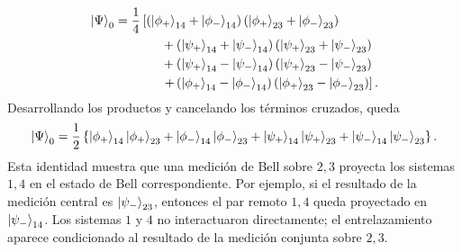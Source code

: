 \documentclass[../main.tex]{subfiles}
\begin{document}
\begin{align*}
    \ket{\Psi}_0
    &=
    \frac{1}{4}
    \left[
        \left(
            \ket{\phi_+}_{14}+\ket{\phi_-}_{14}
        \right)
        \left(
            \ket{\phi_+}_{23}+\ket{\phi_-}_{23}
        \right)
    \right.\\
    &\hspace{1.3cm}
        +
        \left(
            \ket{\psi_+}_{14}+\ket{\psi_-}_{14}
        \right)
        \left(
            \ket{\psi_+}_{23}+\ket{\psi_-}_{23}
        \right)\\
    &\hspace{1.3cm}
        +
        \left(
            \ket{\psi_+}_{14}-\ket{\psi_-}_{14}
        \right)
        \left(
            \ket{\psi_+}_{23}-\ket{\psi_-}_{23}
        \right)\\
    &\hspace{1.3cm}
    \left.
        +
        \left(
            \ket{\phi_+}_{14}-\ket{\phi_-}_{14}
        \right)
        \left(
            \ket{\phi_+}_{23}-\ket{\phi_-}_{23}
        \right)
    \right].
\end{align*}
Desarrollando los productos y cancelando los términos cruzados, queda
\begin{equation*}
    \ket{\Psi}_0
    =
    \frac{1}{2}
    \left\{
        \ket{\phi_+}_{14}\ket{\phi_+}_{23}
        +
        \ket{\phi_-}_{14}\ket{\phi_-}_{23}
        +
        \ket{\psi_+}_{14}\ket{\psi_+}_{23}
        +
        \ket{\psi_-}_{14}\ket{\psi_-}_{23}
    \right\}.
\end{equation*}
Esta identidad muestra que una medición de Bell sobre $2,3$ proyecta los sistemas $1,4$ en el estado de Bell correspondiente. Por ejemplo, si el resultado de la medición central es $\ket{\psi_-}_{23}$, entonces el par remoto $1,4$ queda proyectado en $\ket{\psi_-}_{14}$. Los sistemas $1$ y $4$ no interactuaron directamente; el entrelazamiento aparece condicionado al resultado de la medición conjunta sobre $2,3$.
\end{document}
